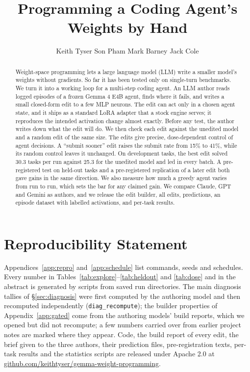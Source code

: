 \documentclass{article} %
\title{Programming a Coding Agent's Weights by Hand}
\author{Keith Tyser \And Son Pham \And Mark Barney \And Jack Cole}
\begin{document}
\maketitle

\begin{abstract}
Weight-space programming lets a large language model (LLM) write a smaller model's weights without gradients. So far it has been tested only on single-turn benchmarks. We turn it into a working loop for a multi-step coding agent. An LLM author reads logged episodes of a frozen Gemma 4 E4B agent, finds where it fails, and writes a small closed-form edit to a few MLP neurons. The edit can act only in a chosen agent state, and it ships as a standard LoRA adapter that a stock engine serves; it reproduces the intended activation change almost exactly. Before any test, the author writes down what the edit will do. We then check each edit against the unedited model and a random edit of the same size. The edits give precise, dose-dependent control of agent decisions. A ``submit sooner'' edit raises the submit rate from 15\% to 41\%, while its random control leaves it unchanged. On development tasks, the best edit solved 30.3 tasks per run against 25.3 for the unedited model and led in every batch. A pre-registered test on held-out tasks and a pre-registered replication of a later edit both gave gains in the same direction. We also measure how much a greedy agent varies from run to run, which sets the bar for any claimed gain. We compare Claude, GPT and Gemini as authors, and we release the edit builder, all edits, predictions, an episode dataset with labelled activations, and per-task results.
\end{abstract}









\section*{Reproducibility Statement}
Appendices~\ref{app:repro} and~\ref{app:schedule} list commands, seeds and schedules. Every number in Tables~\ref{tab:explore}--\ref{tab:heldout} and \ref{tab:dose} and in the abstract is generated by scripts from saved run directories. The main diagnosis tallies of \S\ref{sec:diagnosis} were first computed by the authoring model and then recomputed independently (\texttt{diag\_recompute}); the builder properties of Appendix~\ref{app:gated} come from the authoring models' build reports, which we opened but did not recompute; a few numbers carried over from earlier project notes are marked where they appear. Code, the build report of every edit, the brief given to the three authors, their prediction files, pre-registration texts, per-task results and the statistics scripts are released under Apache 2.0 at \url{github.com/keithtyser/gemma-weight-programming}.




\appendix





\end{document}
